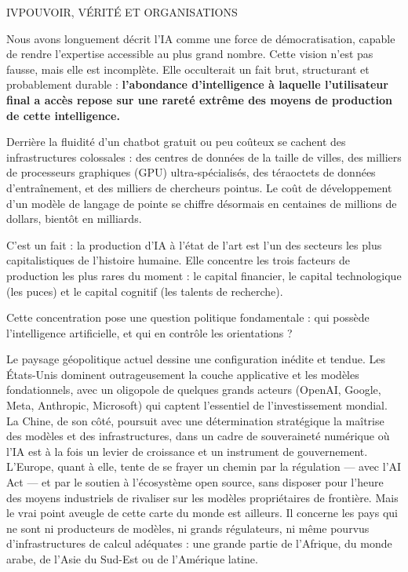 \begin{partdivider}{IV}{POUVOIR, VÉRITÉ ET ORGANISATIONS}\end{partdivider}


Nous avons longuement décrit l'IA comme une force de démocratisation, capable de rendre l'expertise accessible au plus grand nombre. Cette vision n'est pas fausse, mais elle est incomplète. Elle occulterait un fait brut, structurant et probablement durable : \textbf{l'abondance d'intelligence à laquelle l'utilisateur final a accès repose sur une rareté extrême des moyens de production de cette intelligence.}

Derrière la fluidité d'un chatbot gratuit ou peu coûteux se cachent des infrastructures colossales : des centres de données de la taille de villes, des milliers de processeurs graphiques (GPU) ultra-spécialisés, des téraoctets de données d'entraînement, et des milliers de chercheurs pointus. Le coût de développement d'un modèle de langage de pointe se chiffre désormais en centaines de millions de dollars, bientôt en milliards.

C'est un fait : la production d'IA à l'état de l'art est l'un des secteurs les plus capitalistiques de l'histoire humaine. Elle concentre les trois facteurs de production les plus rares du moment : le capital financier, le capital technologique (les puces) et le capital cognitif (les talents de recherche).

Cette concentration pose une question politique fondamentale : qui possède l'intelligence artificielle, et qui en contrôle les orientations ?

Le paysage géopolitique actuel dessine une configuration inédite et tendue. Les États-Unis dominent outrageusement la couche applicative et les modèles fondationnels, avec un oligopole de quelques grands acteurs (OpenAI, Google, Meta, Anthropic, Microsoft) qui captent l'essentiel de l'investissement mondial. La Chine, de son côté, poursuit avec une détermination stratégique la maîtrise des modèles et des infrastructures, dans un cadre de souveraineté numérique où l'IA est à la fois un levier de croissance et un instrument de gouvernement. L'Europe, quant à elle, tente de se frayer un chemin par la régulation — avec l'AI Act — et par le soutien à l'écosystème open source, sans disposer pour l'heure des moyens industriels de rivaliser sur les modèles propriétaires de frontière. Mais le vrai point aveugle de cette carte du monde est ailleurs. Il concerne les pays qui ne sont ni producteurs de modèles, ni grands régulateurs, ni même pourvus d'infrastructures de calcul adéquates : une grande partie de l'Afrique, du monde arabe, de l'Asie du Sud-Est ou de l'Amérique latine.

